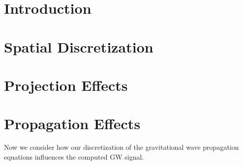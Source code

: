 \documentclass{revtex4}
\begin{document}
\section{Introduction}

\section{Spatial Discretization}

\section{Projection Effects}

\section{Propagation Effects}
Now we consider how our discretization of the gravitational wave propagation equations influences the computed GW signal.
\end{document}
